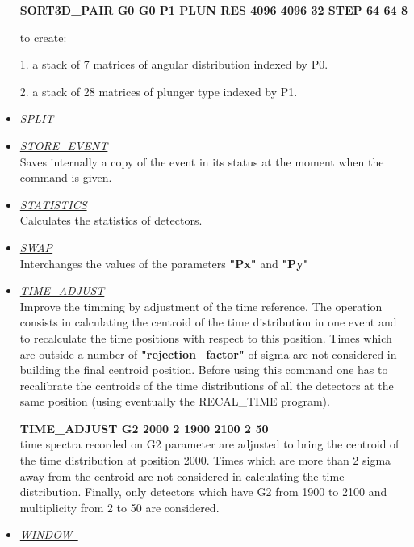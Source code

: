 \begin{itemize}
	\hskip1cm{\bf SORT3D\_PAIR G0 G0 P1 PLUN RES 4096 4096 32  STEP 64 64 8}

	to create:

	1. a stack of 7 matrices of angular distribution indexed by P0.

	2. a stack of 28 matrices of plunger type indexed by P1.


 \item	{\it\underline{SPLIT}} \\

 \item	{\it\underline{STORE\_EVENT}} \\

	Saves internally a copy of the event in its status at the 
	moment when the command is given.

 \item	{\it\underline{STATISTICS}} \\

	Calculates the statistics of detectors.

 \item	{\it\underline{SWAP}} \\

	Interchanges the values of the parameters {\bf "Px"} and {\bf "Py"}

 \item	{\it\underline{TIME\_ADJUST}} \\
	
	Improve the timming by adjustment of the time reference. The operation
	consists in calculating the centroid of the time distribution in one 
	event and to recalculate the time positions with respect to this
	position. Times which are outside a number of {\bf "rejection\_factor"}
	of sigma are not considered in building the final centroid position.
	Before using this command one has to recalibrate the centroids of the
	time distributions of all the detectors at the same position (using
	eventually the RECAL\_TIME program).

	\hskip1cm {\bf TIME\_ADJUST G2 2000 2 1900 2100 2 50} \\
	time spectra recorded on G2 parameter are adjusted to bring the 
	centroid of the time distribution at position 2000. Times which are 
	more than 2 sigma away from the centroid are not considered in 
	calculating the time distribution. Finally, only detectors which have 
	G2 from 1900 to 2100 and multiplicity from 2 to 50 are considered.

 \item	{\it\underline{WINDOW~}}\footnotemark[2] \\


\end{itemize}
